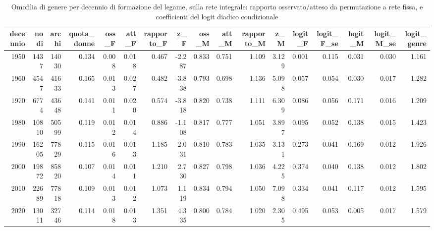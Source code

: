 \begin{table}
\centering
\caption{Omofilia di genere per decennio di formazione del legame, sulla rete integrale: rapporto osservato/atteso da permutazione a rete fissa, e coefficienti del logit diadico condizionale}
\label{tab:t4_omofilia_nel_tempo}
\begin{tabular}{rrrrrrrrrrrrrrrrr}
\toprule
 decennio &  nodi &  archi &  quota\_donne &  oss\_F &  att\_F &  rapporto\_F &    z\_F &  oss\_M &  att\_M &  rapporto\_M &   z\_M &  logit\_F &  logit\_F\_se &  logit\_M &  logit\_M\_se &  logit\_genre \\
\midrule
     1950 &  1437 &  14030 &        0.134 &  0.008 &  0.018 &       0.467 & -2.287 &  0.833 &  0.751 &       1.109 & 3.129 &    0.001 &       0.115 &    0.031 &       0.030 &        1.161 \\
     1960 &  4547 &  41633 &        0.165 &  0.013 &  0.027 &       0.482 & -3.838 &  0.793 &  0.698 &       1.136 & 5.098 &    0.057 &       0.054 &    0.030 &       0.017 &        1.282 \\
     1970 &  6774 &  43648 &        0.141 &  0.011 &  0.020 &       0.574 & -3.818 &  0.820 &  0.738 &       1.111 & 6.309 &    0.086 &       0.056 &    0.171 &       0.016 &        1.209 \\
     1980 & 10810 &  50599 &        0.119 &  0.012 &  0.014 &       0.886 & -1.108 &  0.817 &  0.777 &       1.051 & 3.897 &    0.095 &       0.052 &    0.138 &       0.015 &        1.423 \\
     1990 & 16205 &  77829 &        0.115 &  0.016 &  0.013 &       1.185 &  2.031 &  0.810 &  0.783 &       1.035 & 3.131 &    0.273 &       0.041 &    0.169 &       0.012 &        1.926 \\
     2000 & 19872 &  85820 &        0.107 &  0.014 &  0.011 &       1.210 &  2.730 &  0.827 &  0.798 &       1.036 & 4.225 &    0.374 &       0.040 &    0.138 &       0.012 &        1.802 \\
     2010 & 22689 &  77818 &        0.109 &  0.013 &  0.012 &       1.073 &  1.119 &  0.834 &  0.794 &       1.050 & 7.098 &    0.334 &       0.041 &    0.117 &       0.012 &        1.595 \\
     2020 & 13011 &  32746 &        0.114 &  0.018 &  0.013 &       1.351 &  4.335 &  0.800 &  0.784 &       1.020 & 2.305 &    0.495 &       0.053 &    0.005 &       0.017 &        1.579 \\
\bottomrule
\end{tabular}
\end{table}
